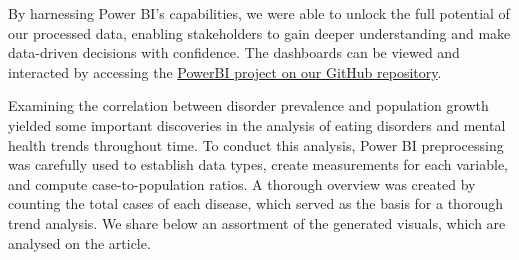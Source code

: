 \documentclass[runningheads]{llncs}
\begin{document}
By harnessing Power BI's capabilities, we were able to unlock the full potential of our processed data, enabling stakeholders to gain deeper understanding and make data-driven decisions with confidence. The dashboards can be viewed and interacted by accessing the \href{https://github.com/rezekiz/big-data-analysis/blob/main/powerbi_files/pbi_project.pbit}{PowerBI project on our GitHub repository}.

Examining the correlation between disorder prevalence and population growth yielded some important discoveries in the analysis of eating disorders and mental health trends throughout time. To conduct this analysis, Power BI preprocessing was carefully used to establish data types, create measurements for each variable, and compute case-to-population ratios. A thorough overview was created by counting the total cases of each disease, which served as the basis for a thorough trend analysis. We share below an assortment of the generated visuals, which are analysed on the article.
\end{document}
